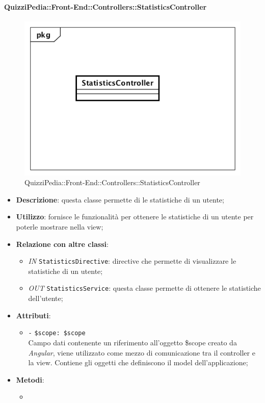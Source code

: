 \paragraph{QuizziPedia::Front-End::Controllers::StatisticsController}
\begin{figure}
	\centering
	\includegraphics[scale=0.45]{UML/Classi/Front-End/QuizziPedia_Front-end_Controller_StatisticsController.png}
	\caption{QuizziPedia::Front-End::Controllers::StatisticsController}
\end{figure}
\begin{itemize}
	\item \textbf{Descrizione}: questa classe permette di le statistiche di un utente;
	\item \textbf{Utilizzo}: fornisce le funzionalità per ottenere le statistiche di un utente per poterle mostrare nella view;
	\item \textbf{Relazione con altre classi}:
	\begin{itemize}
		\item \textit{IN} \texttt{StatisticsDirective}: directive che permette di visualizzare le statistiche di un utente; 
		\item \textit{OUT} \texttt{StatisticsService}: questa classe permette di ottenere le statistiche dell'utente;
	\end{itemize}
	\item \textbf{Attributi}:
	\begin{itemize}
		\item \texttt{-} \texttt{\$scope: \$scope} \\
		Campo dati contenente un riferimento all’oggetto \$scope creato da \textit{Angular}, viene utilizzato come mezzo di comunicazione tra il controller e la view. Contiene gli oggetti che definiscono il model dell’applicazione;
	\end{itemize}
	\item \textbf{Metodi}:
	\begin{itemize}
		\item 
	\end{itemize}
\end{itemize}

